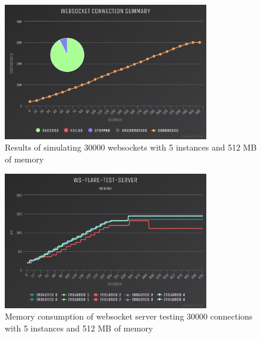 \begin{figure}[H]
  \centering
    \includegraphics[width=0.8\textwidth]{figures/experiments/experiment-1/node-js/conn-summary-30000-5-instances-512-memory.png}
    \caption{Results of simulating 30000 websockets with 5 instances and 512 MB of memory}
    \label{fig:experiment-3-conn-summary-30000-5-instances-512-mem}
\end{figure}

\begin{figure}[H]
  \centering
    \includegraphics[width=0.8\textwidth]{figures/experiments/experiment-1/node-js/memory-30000-5-instances-512-memory.png}
    \caption{Memory consumption of websocket server testing 30000 connections with 5 instances and 512 MB of memory}
    \label{fig:experiment-3-memory-30000-5-instances-512-mem}
\end{figure}

